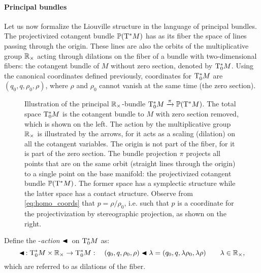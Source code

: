 \paragraph{Principal bundles}
Let us now formalize the Liouville structure in the language of principal bundles. The projectivized cotangent bundle $\mathbb{P}\qty(\mathrm{T}^*M)$ has as its fiber the space of lines passing through the origin. These lines are also the orbits of the multiplicative group $\mathbb{R}_{\times}$ acting through dilations on the fiber of a bundle with two-dimensional fibers: the cotangent bundle of $M$ without zero section, denoted by $\mathrm{T}^*_0M$. Using the canonical coordinates defined previously, coordinates for $\mathrm{T}^*_0M$ are $(q_0, q, \rho_0, \rho)$, where $\rho$ and $\rho_0$ cannot vanish at the same time (the zero section). 
\begin{figure}[h!]
    \begin{center}
        
    \end{center}
    \caption{Illustration of the principal $\mathbb{R}_{\times}$-bundle $\mathrm{T}^*_0M\xrightarrow[]{\pi}\mathbb{P}\qty(\mathrm{T}^*M)$. The total space $\mathrm{T}^*_0M$ is the cotangent bundle to $M$ with zero section removed, which is shown on the left. The action by the multiplicative group $\mathbb{R}_{\times}$ is illustrated by the arrows, for it acts as a scaling (dilation) on all the cotangent variables. The origin is not part of the fiber, for it is part of the zero section. The bundle projection $\pi$ projects all points that are on the same orbit (straight lines through the origin) to a single point on the base manifold: the projectivized cotangent bundle $\mathbb{P}\qty(\mathrm{T}^*M)$. The former space has a symplectic structure while the latter space has a contact structure. Observe from \cref{eq:homo_coords} that $p = \rho/\rho_0$, i.e. such that $p$ is a coordinate for the projectivization by stereographic projection, as shown on the right.}
    \label{fig:principal_bundle}
\end{figure}

Define the \mgroup-\emph{action} $\blacktriangleleft\,$ on $\mathrm{T}^*_0M$ as:
$$ \blacktriangleleft\,: \mathrm{T}^*_0M\times\mathbb{R}_{\times} \to \mathrm{T}^*_0M : \quad (q_0, q, \rho_0, \rho) \blacktriangleleft \lambda = (q_0, q, \lambda \rho_0, \lambda \rho ) \qquad \lambda \in \mathbb{R}_{\times},$$
which are referred to as dilations of the fiber.

